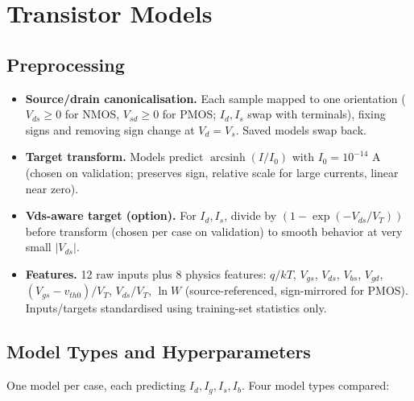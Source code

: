 \documentclass[11pt,a4paper]{article}
\begin{document}
\section{Transistor Models}

\subsection{Preprocessing}
\begin{itemize}[leftmargin=*]
\item \textbf{Source/drain canonicalisation.} Each sample mapped to one orientation ($V_{ds}\ge 0$ for NMOS, $V_{sd}\ge 0$ for PMOS; $I_d,I_s$ swap with terminals), fixing signs and removing sign change at $V_d=V_s$. Saved models swap back.
\item \textbf{Target transform.} Models predict $\operatorname{arcsinh}(I/I_0)$ with $I_0=10^{-14}$ A (chosen on validation; preserves sign, relative scale for large currents, linear near zero).
\item \textbf{Vds-aware target (option).} For $I_d,I_s$, divide by $(1-\exp(-V_{ds}/V_T))$ before transform (chosen per case on validation) to smooth behavior at very small $|V_{ds}|$.
\item \textbf{Features.} 12 raw inputs plus 8 physics features: $q/kT$, $V_{gs}$, $V_{ds}$, $V_{bs}$, $V_{gd}$, $(V_{gs}-v_{th0})/V_T$, $V_{ds}/V_T$, $\ln W$ (source-referenced, sign-mirrored for PMOS). Inputs/targets standardised using training-set statistics only.
\end{itemize}

\subsection{Model Types and Hyperparameters}
One model per case, each predicting $I_d,I_g,I_s,I_b$. Four model types compared:

\begin{table}[H]\centering\small
\caption{Model types}
\end{table}
\end{document}
